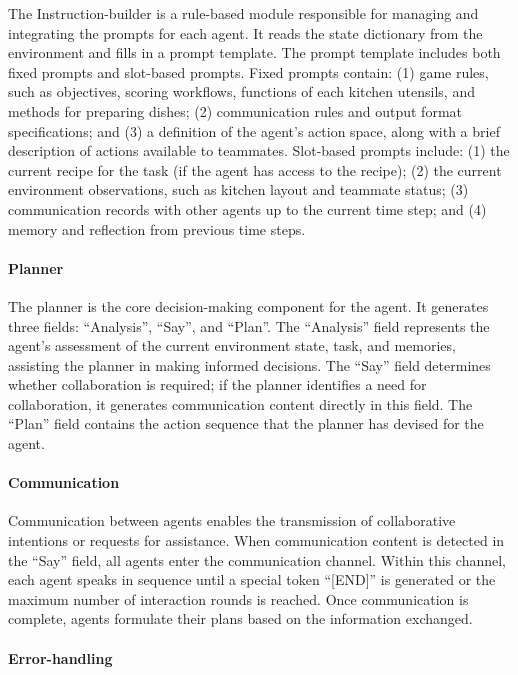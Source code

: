 \documentclass[11pt]{article}
\begin{document}
The Instruction-builder is a rule-based module responsible for managing and integrating the prompts for each agent. It reads the state dictionary from the environment and fills in a prompt template. The prompt template includes both fixed prompts and slot-based prompts. Fixed prompts contain: (1) game rules, such as objectives, scoring workflows, functions of each kitchen utensils, and methods for preparing dishes; (2) communication rules and output format specifications; and (3) a definition of the agent’s action space, along with a brief description of actions available to teammates. Slot-based prompts include: (1) the current recipe for the task (if the agent has access to the recipe); (2) the current environment observations, such as kitchen layout and teammate status; (3) communication records with other agents up to the current time step; and (4) memory and reflection from previous time steps.

\paragraph{Planner}

The planner is the core decision-making component for the agent. It generates three fields: ``Analysis'', ``Say'', and ``Plan''. The ``Analysis'' field represents the agent’s assessment of the current environment state, task, and memories, assisting the planner in making informed decisions. The ``Say'' field determines whether collaboration is required; if the planner identifies a need for collaboration, it generates communication content directly in this field. The ``Plan'' field contains the action sequence that the planner has devised for the agent.

\paragraph{Communication}

Communication between agents enables the transmission of collaborative intentions or requests for assistance. When communication content is detected in the ``Say'' field, all agents enter the communication channel. Within this channel, each agent speaks in sequence until a special token ``[END]'' is generated or the maximum number of interaction rounds is reached. Once communication is complete, agents formulate their plans based on the information exchanged.


\paragraph{Error-handling}
\end{document}
